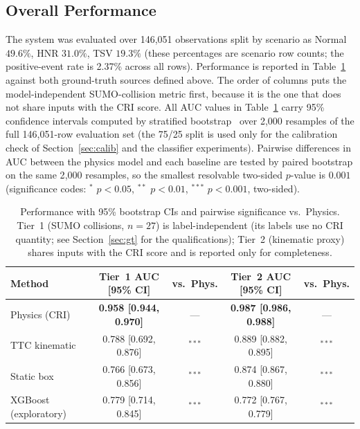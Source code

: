 \documentclass[sn-mathphys-num,Numbered,iicol]{sn-jnl}
\begin{document}
\subsection{Overall Performance}\label{sec:overall_perf}
The system was evaluated over 146{,}051 observations split by scenario as Normal $49.6\%$, HNR $31.0\%$, TSV $19.3\%$ (these percentages are scenario row counts; the positive-event rate is 2.37\% across all rows). Performance is reported in Table~\ref{tab:perf} against both ground-truth sources defined above. The order of columns puts the model-independent SUMO-collision metric first, because it is the one that does not share inputs with the CRI score. All AUC values in Table~\ref{tab:perf} carry 95\% confidence intervals computed by stratified bootstrap~\cite{efron1993} over 2{,}000 resamples of the full 146{,}051-row evaluation set (the 75/25 split is used only for the calibration check of Section~\ref{sec:calib} and the classifier experiments). Pairwise differences in AUC between the physics model and each baseline are tested by paired bootstrap on the same 2{,}000 resamples, so the smallest resolvable two-sided $p$-value is $0.001$ (significance codes: $^{\ast}$ $p<0.05$, $^{\ast\ast}$ $p<0.01$, $^{\ast\ast\ast}$ $p<0.001$, two-sided).

\begin{table}[htbp]
  \centering
  \caption{Performance with 95\% bootstrap CIs and pairwise significance vs.\ Physics. Tier~1 (SUMO collisions, $n=27$) is label-independent (its labels use no CRI quantity; see Section~\ref{sec:gt} for the qualifications); Tier~2 (kinematic proxy) shares inputs with the CRI score and is reported only for completeness.}
  \label{tab:perf}
  \renewcommand{\arraystretch}{1.25}
  \begin{tabular}{@{}lcccc@{}}
    \toprule
    \textbf{Method} & \textbf{Tier~1 AUC [95\% CI]} & \textbf{vs.\ Phys.} & \textbf{Tier~2 AUC [95\% CI]} & \textbf{vs.\ Phys.} \\
    \midrule
    Physics (CRI)         & \textbf{0.958 [0.944, 0.970]} & ---                & \textbf{0.987 [0.986, 0.988]} & ---  \\
    TTC kinematic         & 0.788 [0.692, 0.876]          & $^{\ast\ast\ast}$  & 0.889 [0.882, 0.895]          & $^{\ast\ast\ast}$ \\
    Static box            & 0.766 [0.673, 0.856]          & $^{\ast\ast\ast}$  & 0.874 [0.867, 0.880]          & $^{\ast\ast\ast}$ \\
    XGBoost (exploratory) & 0.779 [0.714, 0.845]          & $^{\ast\ast\ast}$  & 0.772 [0.767, 0.779]          & $^{\ast\ast\ast}$ \\
    \bottomrule
  \end{tabular}
\end{table}
\end{document}
